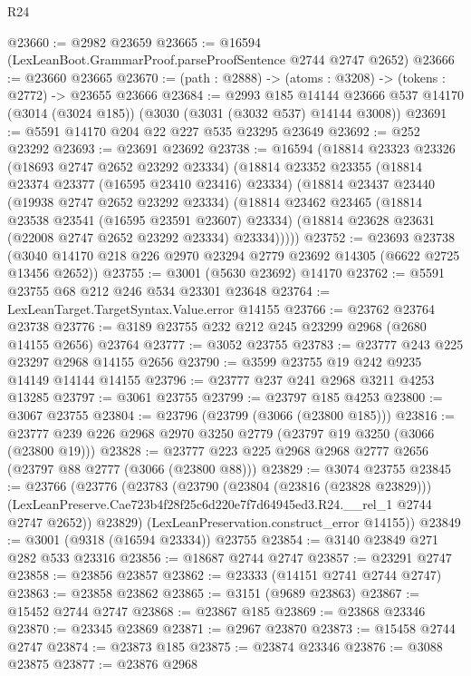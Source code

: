 \begin{lexlean}{R24}
\begin{coremodule}
@23660 := @2982 @23659
@23665 := @16594 (LexLeanBoot.GrammarProof.parseProofSentence @2744 @2747 @2652)
@23666 := @23660 @23665
@23670 := (path : @2888) -> (atoms : @3208) -> (tokens : @2772) -> @23655 @23666
@23684 := @2993
    @185
    @14144
    @23666
    @537
    @14170
    (@3014 (@3024 @185))
    (@3030 (@3031 (@3032 @537) @14144 @3008))
@23691 := @5591 @14170 @204 @22 @227 @535 @23295 @23649
@23692 := @252 @23292
@23693 := @23691 @23692
@23738 := @16594
    (@18814
      @23323
      @23326
      (@18693 @2747 @2652 @23292 @23334)
      (@18814
        @23352
        @23355
        (@18814 @23374 @23377 (@16595 @23410 @23416) @23334)
        (@18814
          @23437
          @23440
          (@19938 @2747 @2652 @23292 @23334)
          (@18814
            @23462
            @23465
            (@18814 @23538 @23541 (@16595 @23591 @23607) @23334)
            (@18814 @23628 @23631 (@22008 @2747 @2652 @23292 @23334) @23334)))))
@23752 := @23693
    @23738
    (@3040 @14170 @218 @226 @2970 @23294 @2779 @23692 @14305 (@6622 @2725 @13456 @2652))
@23755 := @3001 (@5630 @23692) @14170
@23762 := @5591 @23755 @68 @212 @246 @534 @23301 @23648
@23764 := LexLeanTarget.TargetSyntax.Value.error @14155
@23766 := @23762 @23764 @23738
@23776 := @3189 @23755 @232 @212 @245 @23299 @2968 (@2680 @14155 @2656) @23764
@23777 := @3052 @23755
@23783 := @23777 @243 @225 @23297 @2968 @14155 @2656
@23790 := @3599 @23755 @19 @242 @9235 @14149 @14144 @14155
@23796 := @23777 @237 @241 @2968 @3211 @4253 @13285
@23797 := @3061 @23755
@23799 := @23797 @185 @4253
@23800 := @3067 @23755
@23804 := @23796 (@23799 (@3066 (@23800 @185)))
@23816 := @23777 @239 @226 @2968 @2970 @3250 @2779 (@23797 @19 @3250 (@3066 (@23800 @19)))
@23828 := @23777 @223 @225 @2968 @2968 @2777 @2656 (@23797 @88 @2777 (@3066 (@23800 @88)))
@23829 := @3074 @23755
@23845 := @23766
    (@23776
      (@23783
        (@23790
          (@23804 (@23816 (@23828 @23829)))
          (LexLeanPreserve.Cae723b4f28f25c6d220e7f7d64945ed3.R24.__rel_1 @2744 @2747 @2652))
        @23829)
      (LexLeanPreservation.construct_error @14155))
@23849 := @3001 (@9318 (@16594 @23334)) @23755
@23854 := @3140 @23849 @271 @282 @533 @23316
@23856 := @18687 @2744 @2747
@23857 := @23291 @2747
@23858 := @23856 @23857
@23862 := @23333 (@14151 @2741 @2744 @2747)
@23863 := @23858 @23862
@23865 := @3151 (@9689 @23863)
@23867 := @15452 @2744 @2747
@23868 := @23867 @185
@23869 := @23868 @23346
@23870 := @23345 @23869
@23871 := @2967 @23870
@23873 := @15458 @2744 @2747
@23874 := @23873 @185
@23875 := @23874 @23346
@23876 := @3088 @23875
@23877 := @23876 @2968

\end{coremodule}
\end{lexlean}
